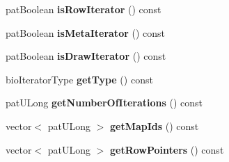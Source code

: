 \begin{DoxyCompactItemize}
pat\+Boolean {\bfseries is\+Row\+Iterator} () const
\item 
\mbox{\label{classbio_iterator_info_a9c85a419a34cc10756ed3b6ab0b5e1b3}} 
pat\+Boolean {\bfseries is\+Meta\+Iterator} () const
\item 
\mbox{\label{classbio_iterator_info_a1c844072f33a1693880d94bb4b7844df}} 
pat\+Boolean {\bfseries is\+Draw\+Iterator} () const
\item 
\mbox{\label{classbio_iterator_info_abd14fc3d3c21520afac4925396091b60}} 
bio\+Iterator\+Type {\bfseries get\+Type} () const
\item 
\mbox{\label{classbio_iterator_info_ad90c29752a7b025158d44b2b31a856e3}} 
pat\+U\+Long {\bfseries get\+Number\+Of\+Iterations} () const
\item 
\mbox{\label{classbio_iterator_info_a31384c3f193dd9e52bd5ca3b488ee3cc}} 
vector$<$ pat\+U\+Long $>$ {\bfseries get\+Map\+Ids} () const
\item 
\mbox{\label{classbio_iterator_info_ad94172f707209c49bd8c0a04bb52357c}} 
vector$<$ pat\+U\+Long $>$ {\bfseries get\+Row\+Pointers} () const
\end{DoxyCompactItemize}

